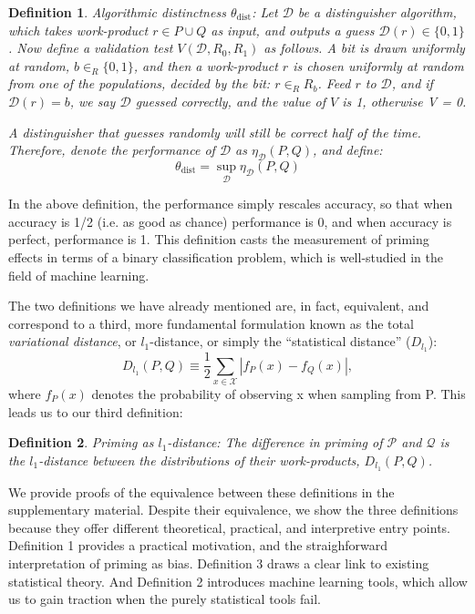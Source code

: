 \documentclass[12pt]{article}
\newtheorem*{mydef}{Definition}
\begin{document}
\begin{mydef}
	{\upshape Algorithmic distinctness $\theta_\mathrm{dist}$:}
	Let $\mathcal{D}$ be a distinguisher algorithm, which takes work-product 
	$r \in P \cup Q$ as input, and outputs a \emph{guess} 
	$\mathcal{D}(r) \in \{0, 1\}$. Now define a validation test 
	$V(\mathcal{D}, R_0, R_1)$ as follows. A bit is drawn uniformly at random, 
	$b \in_R \{0, 1\}$, and then a work-product $r$ is chosen uniformly at 
	random from one of the populations, decided by the bit: $r \in_R R_b$. 
	Feed $r$ to $\mathcal{D}$, and if $\mathcal{D}(r) = b$, we say 
	$\mathcal{D}$ guessed correctly, and the value of $V$ is 1, 
	otherwise V = 0.

	A distinguisher that guesses randomly will still be correct half of the 
	time. Therefore, denote the performance of $\mathcal{D}$ as 
	$\eta_\mathcal{D}(P, Q)$, and define:
	$$ 
		\theta_\mathrm{dist} = \sup_\mathcal{D} \eta_\mathcal{D}(P,Q)
	$$

\end{mydef}
In the above definition, the performance simply rescales accuracy, so that when
accuracy is 1/2 (i.e. as good as chance) performance is 0, and when accuracy 
is perfect, performance is 1. This definition casts the measurement of priming 
effects in terms of a binary classification problem, which is well-studied in 
the field of machine learning.

The two definitions we have already mentioned are, in fact, equivalent, and 
correspond to a third, more fundamental formulation known as the total 
\textit{variational distance}, or $l_1$-distance, or simply the “statistical 
distance” ($D_{l_1}$):
$$
	D_{l_1}(P,Q) \equiv \frac{1}{2} \sum_{x \in \mathcal{X}} 
	\left| 
		f_P(x) - f_Q(x)
	\right|,
$$
where $f_P(x)$ denotes the probability of observing x when sampling from P. 
This leads us to our third definition:

\begin{mydef}
	{\upshape Priming as $l_1$-distance:}
	The difference in priming of $\mathcal{P}$ and $\mathcal{Q}$ is the 
	$l_1$-distance between the distributions of their work-products, 
	$D_{l_1}(P,Q)$.
\end{mydef}

We provide proofs of the equivalence between these definitions in the 
supplementary material. Despite their equivalence, we show the three 
definitions because they offer different theoretical, practical, and 
interpretive entry points. Definition 1 provides a practical motivation, and 
the straighforward interpretation of priming as bias. Definition 3 draws a 
clear link to existing statistical theory. And Definition 2 introduces machine 
learning tools, which allow us to gain traction when the purely statistical 
tools fail.
\end{document}
